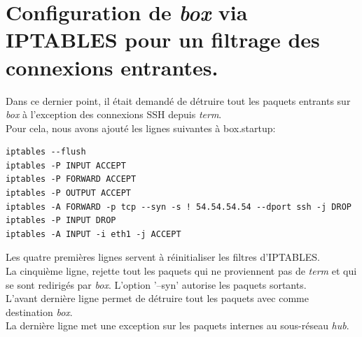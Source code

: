 \documentclass[12pt,a4paper,utf8x]{report}
\begin{document}
\section[Filtrage sur \emph{box} des connexions entrantes]{Configuration de \emph{box} via IPTABLES pour un filtrage des connexions entrantes.}
Dans ce dernier point, il était demandé de détruire tout les paquets entrants sur \emph{box} à l'exception des connexions SSH depuis \emph{term}.\\
Pour cela, nous avons ajouté les lignes suivantes à box.startup:
\begin{verbatim}
iptables --flush
iptables -P INPUT ACCEPT
iptables -P FORWARD ACCEPT
iptables -P OUTPUT ACCEPT
iptables -A FORWARD -p tcp --syn -s ! 54.54.54.54 --dport ssh -j DROP
iptables -P INPUT DROP
iptables -A INPUT -i eth1 -j ACCEPT
\end{verbatim}
Les quatre premières lignes servent à réinitialiser les filtres d'IPTABLES.\\
La cinquième ligne, rejette tout les paquets qui ne proviennent pas de \emph{term} et qui se sont redirigés par \emph{box}. L'option '--syn' autorise les paquets sortants.\\
L'avant dernière ligne permet de détruire tout les paquets avec comme destination \emph{box}.\\
La dernière ligne met une exception sur les paquets internes au sous-réseau \emph{hub}.
\end{document}
